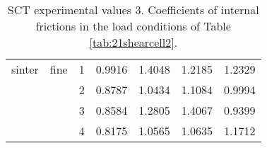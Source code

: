 \begin{table}[h]
\begin{tabular}{ll|c|cccc}
\hline 
    sinter & fine  & 1     & 0.9916 & 1.4048 & 1.2185 & 1.2329 \\
          &       & 2     & 0.8787 & 1.0434 & 1.1084 & 0.9994 \\
          &       & 3     & 0.8584 & 1.2805 & 1.4067 & 0.9399 \\
          &       & 4     & 0.8175 & 1.0565 & 1.0635 & 1.1712 \\
         \hline
\end{tabular}
\caption[SCT experimental values 3]{\acs{SCT} experimental values 3.
Coefficients of internal frictions in the load conditions of Table
\ref{tab:21shearcell2}.}
\label{tab:22shearcell3}
\end{table}